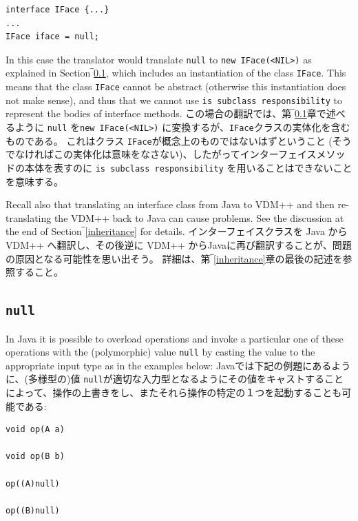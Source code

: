 \documentclass[\pformat,12pt]{jarticle}
\begin{document}
\begin{small}
\begin{verbatim}
interface IFace {...}
...
IFace iface = null;
\end{verbatim}
\end{small}

In this case the translator would translate \texttt{null} to
\texttt{new IFace(<NIL>)} as explained in 
Section‾\ref{null}, which includes an instantiation of the class
\texttt{IFace}. This means that the class \texttt{IFace} cannot be
abstract (otherwise this instantiation does not make sense), and thus
that we cannot use \texttt{is subclass responsibility} to represent
the bodies of interface methods.
この場合の翻訳では、第‾\ref{null}章で述べるように \texttt{null} を\texttt{new IFace(<NIL>)} に変換するが、\texttt{IFace}クラスの実体化を含むものである。 
これはクラス \texttt{IFace}が概念上のものではないはずということ (そうでなければこの実体化は意味をなさない)、したがってインターフェイスメソッドの本体を表すのに \texttt{is subclass responsibility} を用いることはできないことを意味する。

Recall also that translating an interface class from Java to VDM++ and
then re-translating the VDM++ back to Java can cause problems. See the
discussion at the end of Section‾\ref{inheritance} for details.
インターフェイスクラスを Java から VDM++ へ翻訳し、その後逆に VDM++ からJavaに再び翻訳することが、問題の原因となる可能性を思い出そう。
詳細は、第‾\ref{inheritance}章の最後の記述を参照すること。


\subsection{\texttt{null}}\label{null}

In Java it is possible to overload operations and invoke a particular
one of these operations with the (polymorphic) value \texttt{null} by
casting the value to the appropriate input type as in the examples
below: 
Javaでは下記の例題にあるように、(多様型の)値 \texttt{null}が適切な入力型となるようにその値をキャストすることによって、操作の上書きをし、またそれら操作の特定の１つを起動することも可能である: 

\begin{small}
\begin{verbatim}
void op(A a)  
 
void op(B b)   

op((A)null)

op((B)null)
\end{verbatim}
\end{small}
\end{document}
